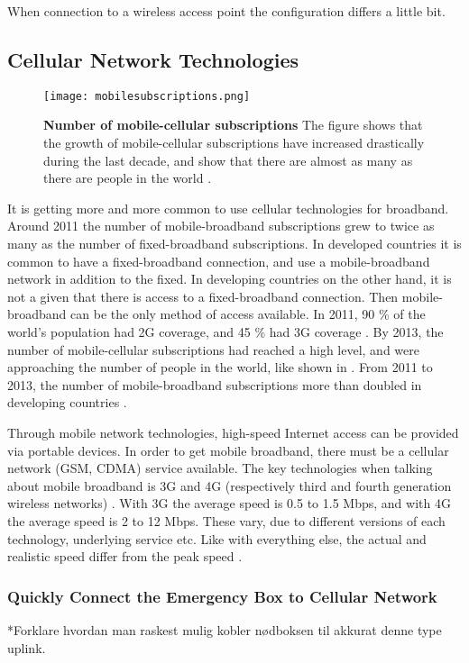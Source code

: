 When connection to a wireless access point the configuration differs a little bit.

\subsection{Cellular Network Technologies}

\begin{figure}[b]
  \centering
      \texttt{[image: mobilesubscriptions.png]}
  \caption [Number of mobile-cellular subscriptions]{\textbf{Number of mobile-cellular subscriptions} The figure shows that the growth of mobile-cellular subscriptions have increased drastically during the last decade, and show that there are almost as many as there are people in the world \cite{itu2013}.}
  \label{fig:subscribers}
\end{figure}

It is getting more and more common to use cellular technologies for broadband. Around 2011 the number of mobile-broadband subscriptions grew to twice as many as the number of fixed-broadband subscriptions. In developed countries it is common to have a fixed-broadband connection, and use a mobile-broadband network in addition to the fixed. In developing countries on the other hand, it is not a given that there is access to a fixed-broadband connection. Then mobile-broadband can be the only method of access available. In 2011, 90 \% of the world's population had 2G coverage, and 45 \% had 3G coverage \cite{itu2011}. By 2013, the number of mobile-cellular subscriptions had reached a high level, and were approaching the number of people in the world, like shown in . From 2011 to 2013, the number of mobile-broadband  subscriptions more than doubled in developing countries \cite{itu2013}. 

Through mobile network technologies, high-speed Internet access can be provided via portable devices. In order to get mobile broadband, there must be a cellular network (GSM, CDMA) service available. The key technologies when talking about mobile broadband is 3G and 4G (respectively third and fourth generation wireless networks) \cite{mobilebroadband}. With 3G the average speed is 0.5 to 1.5 Mbps, and with 4G the average speed is 2 to 12 Mbps. These vary, due to different versions of each technology, underlying service etc. Like with everything else, the actual and realistic speed differ from the peak speed \cite{3gvs4g}. 

\subsubsection{Quickly Connect the Emergency Box to Cellular Network}
*Forklare hvordan man raskest mulig kobler nødboksen til akkurat denne type uplink.


